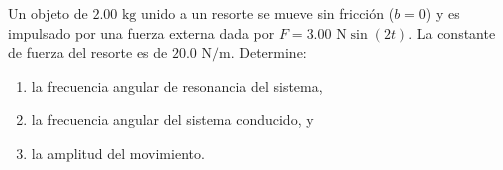\item Un objeto de $2.00\text{ kg}$ unido a un resorte se mueve sin fricción ($b = 0$) y es impulsado por una fuerza externa dada por $F = 3.00\text{ N} \sin(2t)$. La constante de fuerza del resorte es de $20.0\text{ N/m}$. Determine:
\begin{enumerate}
    \item la frecuencia angular de resonancia del sistema,
    \item la frecuencia angular del sistema conducido, y
    \item la amplitud del movimiento.
\end{enumerate}